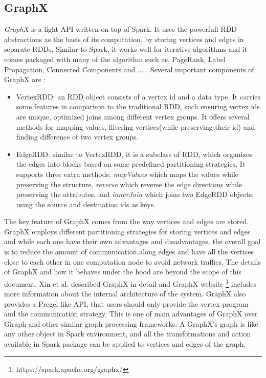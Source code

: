 \documentclass[english]{tktltiki}
\begin{document}
\subsection{GraphX}
\textit{GraphX} is a light API written on top of Spark. It uses the powerfull RDD abstractions as the basis of its computation, by storing vertices and edges in separate RDDs. Similar to Spark, it works well for iterative algorithms and it comes packaged with many of the algorithm such as, PageRank, Label Propagation, Connected Components and ... .  Several important components of GraphX are :
\begin{itemize}
\item VertexRDD: an RDD object consists of a vertex id and a data type. It carries some features in comparison to the traditional RDD, such ensuring vertex ids are unique, optimized joins among different vertex groups. It offers several methods for mapping values, filtering vertices(while preserving their id) and finding difference of two vertex groups.
\item EdgeRDD: similar to VertexRDD, it is a subclass of RDD, which organizes the edges into blocks based on some predefined partitioning strategies. It supports three extra methods; \textit{mapValues} which maps the values while preserving the structure, \textit{reverse} which reverse the edge directions while preserving the attributes, and \textit{innerJoin} which joins two EdgeRDD objects, using the source and destination ids as keys. 
\end{itemize}
The key feature of GraphX comes from the way vertices and edges are stored. GraphX employs different partitioning strategies for storing vertices and edges and while each one have their own advantages and disadvantages, the overall goal is to reduce the amount of communication along edges and have all the vertices close to each other in one computation node to avoid network traffics. The details of GraphX and how it behaves under the hood are beyond the scope of this document. Xin et al. \cite{xin13} described GraphX in detail and GraphX website  \footnote{https://spark.apache.org/graphx/} includes more information about the internal architecture of the system.
GraphX also provides a Pregel like API, that users should only provide the vertex program and the communication strategy. This is one of main advantages of GraphX over Giraph and other similar graph processing frameworks. A GraphX's graph is like any other object in Spark environment, and all the transformations and action available in Spark package can be applied to vertices and edges of the graph. 
\end{document}
